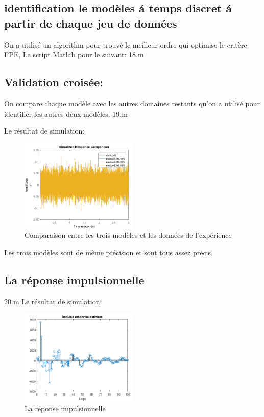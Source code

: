 \documentclass[twoside,twocolumn]{article}
\begin{document}
\subsection{identification le modèles á temps discret á partir de chaque jeu de données}
On a utilisé un algorithm pour trouvé le meilleur ordre qui optimise le critère FPE, 
Le script Matlab pour le suivant:
\label{matlab}
 {18.m}

\subsection{Validation croisée:}
On compare chaque modèle avec les autres domaines restants qu'on a utilisé pour identifier les autres deux modèles:
\label{matlab}
 {19.m}

Le résultat de simulation:
\begin{figure}[H]
\centering
\includegraphics[width=0.5\textwidth]{Images/19.png}
\caption{Comparaison entre les trois modèles et les données de l'expérience}
\end{figure}

Les trois modèles sont de même précision et sont tous assez précis.
\subsection{La réponse impulsionnelle}

\label{matlab}
 {20.m}
Le résultat de simulation:

\begin{figure}[H]
\centering
\includegraphics[width=0.5\textwidth]{Images/20.png}
\caption{La réponse impulsionnelle}
\end{figure}
\end{document}
